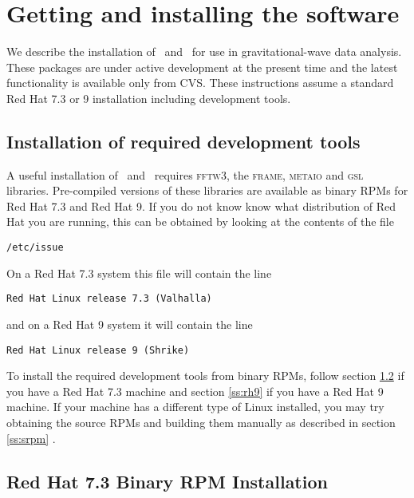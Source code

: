 %
%
\color{black}
\section{Getting and installing the software}

We describe the installation of \lal\ and \lalapps\ for use in
gravitational-wave data analysis.   These packages are under active
development at the present time and the latest functionality is
available only from CVS.   These instructions assume a standard
Red Hat 7.3 or 9 installation including development tools.   

\subsection{Installation of required development tools}

A useful installation of \lal\ and \lalapps\ requires \textsc{fftw3},
the \textsc{frame}, \textsc{metaio} and \textsc{gsl} libraries.   Pre-compiled
versions of these libraries are available as binary RPMs for Red Hat 7.3 and
Red Hat 9. If you do not know know what distribution of Red Hat you are
running, this can be obtained by looking at the contents of the file 
\begin{verbatim}
/etc/issue
\end{verbatim}
On a Red Hat 7.3 system this file will contain the line
\begin{verbatim}
Red Hat Linux release 7.3 (Valhalla)
\end{verbatim}
and on a Red Hat 9 system it will contain the line
\begin{verbatim}
Red Hat Linux release 9 (Shrike)
\end{verbatim}
To install the required development tools from binary RPMs, follow section
\ref{ss:rh73} if you have a Red Hat 7.3 machine and section \ref{ss:rh9} if
you have a Red Hat 9 machine. If your machine has a different type of Linux
installed, you may try obtaining the source RPMs and building them manually as
described in section \ref{ss:srpm} .

\subsection{Red Hat 7.3 Binary RPM Installation}
\label{ss:rh73}

